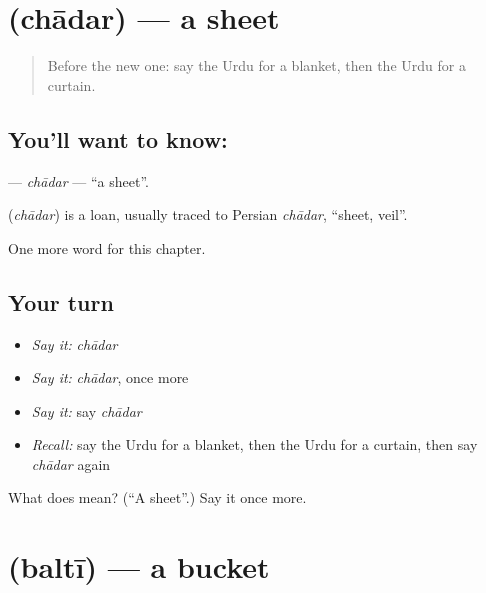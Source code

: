\section[\texorpdfstring{\ur{چادر} (chādar)}{چادر (chādar)}]{ (chādar) — a sheet}

\label{lesson:UR-C107-chadar}



\begin{quote}
Before the new one: say the Urdu for a blanket, then the Urdu for a curtain.
\end{quote}

\subsection*{You'll want to know: }
\textbf{} — \emph{chādar} — \textquotedblleft{}a sheet\textquotedblright{}.

\begin{cousinweb}
\textbf{} (\emph{chādar}) is a loan, usually traced to Persian \emph{chādar}, \textquotedblleft{}sheet, veil\textquotedblright{}.
\end{cousinweb}

\begin{grammarlens}[title={What you've built}]
One more word for this chapter.
\end{grammarlens}

\subsection*{Your turn}
\begin{itemize}
\raggedright
  \item \emph{Say it:} \emph{chādar}
  \item \emph{Say it:} \emph{chādar}, once more
  \item \emph{Say it:} say \emph{chādar}
  \item \emph{Recall:} say the Urdu for a blanket, then the Urdu for a curtain, then say \emph{chādar} again
\end{itemize}

\begin{tcolorbox}[breakable,colback=teal!4,colframe=teal!35!black,title={Before you move on}]
What does  mean? (\textquotedblleft{}A sheet\textquotedblright{}.) Say it once more.
\end{tcolorbox}
\section[\texorpdfstring{\ur{بالٹی} (baltī)}{بالٹی (baltī)}]{ (baltī) — a bucket}

